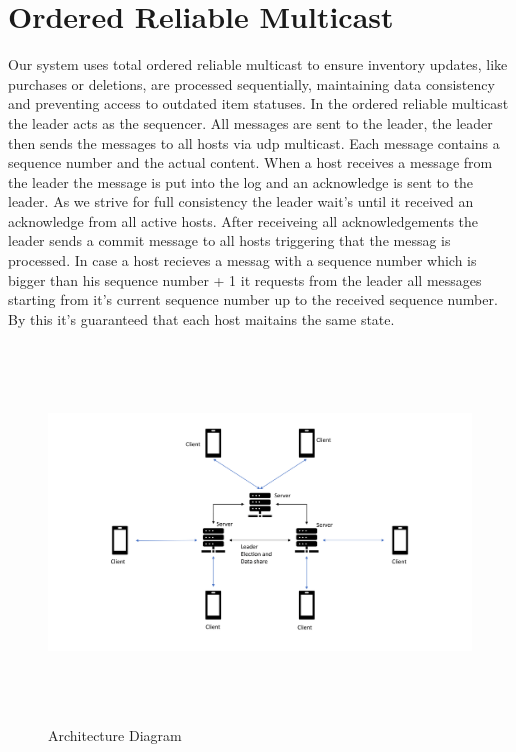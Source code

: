 \section{Ordered Reliable Multicast} \label{sec:OrderedReliableMulticast}
Our system uses total ordered reliable multicast to ensure inventory updates, like purchases or deletions, are processed sequentially, maintaining data consistency and preventing access to outdated item statuses. In the ordered reliable multicast the leader acts as the sequencer. All messages are sent to the leader, the leader then sends the messages to all hosts via udp multicast. Each message contains a sequence number and the actual content. When a host receives a message from the leader the message is put into the log and an acknowledge is sent to the leader. As we strive for full consistency the leader wait's until it received an acknowledge from all active hosts. After receiveing all acknowledgements the leader sends a commit message to all hosts triggering that the messag is processed. In case a host recieves a messag with a sequence number which is bigger than his sequence number + 1 it requests from the leader all messages starting from it's current sequence number up to the received sequence number. By this it's guaranteed that each host maitains the same state. 




\begin{figure}[h!]
        \includegraphics[height=10cm, width=18cm]{images/Architecture.png}
        \caption{Architecture Diagram}
        \label{fig:architecture}
\end{figure}
